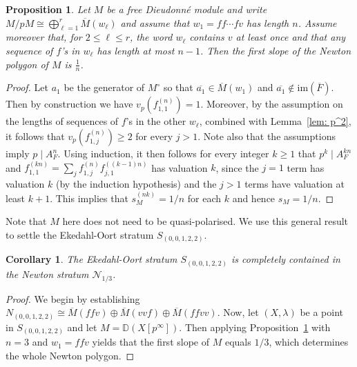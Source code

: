 \documentclass[11pt,table]{amsart}
\numberwithin{equation}{section}
\newtheorem{prop}[thm]{Proposition}
\newtheorem{cor}[thm]{Corollary}
\theoremstyle{definition}
\theoremstyle{remark}
\theoremstyle{remark}
\begin{document}
\begin{prop} \label{prop: slope=1/n}
Let $M$ be a free Dieudonn\'{e} module and write $M/pM \cong \bigoplus_{\ell=1}^r \overline{M}(w_\ell)$ and assume that $w_1=ff \cdots fv$ has length $n$. Assume moreover that, for $2\leq \ell \leq r$, the word $w_\ell$ contains $v$ at least once and that any sequence of $f$'s in $w_\ell$ has length at most $n-1$. Then the first slope of the Newton polygon of $M$ is $\frac{1}{n}$.
\end{prop}
\begin{proof}
Let $a_1$ be the generator of $M^\circ$ so that $\overline{a_1} \in \overline{M}(w_1)$ and $\overline{a_1} \notin \mathrm{im}(\overline{F})$. Then by construction we have $v_p\left(f_{1,1}^{(n)}\right) = 1$. Moreover, by the assumption on the lengths of sequences of $f$'s in the other $w_\ell$, combined with Lemma~\ref{lem: p^2}, it follows that $v_p\left( f_{1,j}^{(n)}\right)\geq 2$ for every $j>1$. Note also that the assumptions imply $p \mid A_F^n$. Using induction, it then follows for every integer $k\geq 1$ that $p^k \mid A_F^{kn}$ and
$f_{1,1}^{(kn)} = \sum_{j} f_{1,j}^{(n)} f_{j,1}^{((k-1)n)}$
has valuation $k$, since the $j=1$ term has valuation $k$ (by the induction hypothesis) and the $j>1$ terms have valuation at least $k+1$. This implies that $s_M^{(nk)}=1/n$ for each $k$ and hence $s_M=1/n$.
\end{proof}

Note that $M$ here does not need to be quasi-polarised. We use this general result to settle the Ekedahl-Oort stratum $S_{(0,0,1,2,2)}$.

\begin{cor} \label{cor: (0,0,1,2,2) cont 1/3}
The Ekedahl-Oort stratum $S_{(0,0,1,2,2)}$ is completely contained in the Newton stratum $\mathcal{N}_{1/3}$.
\end{cor}
\begin{proof}
We begin by establishing $N_{(0,0,1,2,2)} \cong \overline{M}(ffv) \oplus \overline{M}(vvf) \oplus \overline{M}(ffvv)$. Now, let $(X,\lambda)$ be a point in $S_{(0,0,1,2,2)}$ and let $M=\mathbb{D}(X[p^\infty])$. Then applying Proposition~\ref{prop: slope=1/n} with $n=3$ and $w_1=ffv$ yields that the first slope of $M$ equals $1/3$, which determines the whole Newton polygon.
\end{proof}
\end{document}
